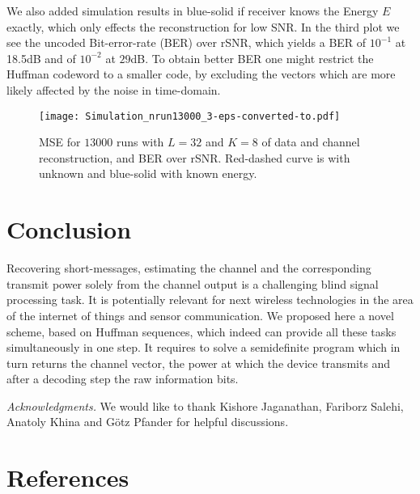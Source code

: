 \documentclass[conference]{IEEEtran}
\begin{document}
We also added simulation results in blue-solid if receiver knows the Energy $E$ exactly, which only effects the
reconstruction for low SNR.  In the third plot we see the uncoded Bit-error-rate (BER) over rSNR, which yields a BER of
$10^{-1}$ at 18.5dB and of $10^{-2}$ at $29$dB. To obtain better BER one might restrict the Huffman codeword  to a
smaller code, by excluding the vectors which are more likely affected by the noise in time-domain. 
%
\begin{figure}[t]
  \centering\texttt{[image: Simulation\_nrun13000\_3-eps-converted-to.pdf]}
    \caption{MSE for $13000$ runs with $L=32$ and $K=8$ of data and channel reconstruction, and BER over rSNR. 
      Red-dashed curve is with unknown and blue-solid with known energy.}\label{fig:simulation}
\end{figure}
%

\section{Conclusion} 
Recovering short-messages, estimating the channel and the corresponding transmit power solely from the channel output is
a challenging blind signal processing task. It is potentially relevant for next wireless technologies in the area of the
internet of things and sensor communication. We proposed here a novel scheme, based on Huffman sequences, which indeed
can provide all these tasks simultaneously in one step. It requires to solve a semidefinite program which in turn
returns the channel vector, the power at which the device transmits and after a decoding step the raw information bits.

{\it Acknowledgments.} We would like to thank Kishore Jaganathan, Fariborz Salehi, Anatoly Khina  and
Götz Pfander for helpful discussions. 

\section*{References}

\printbibliography
\end{document}
